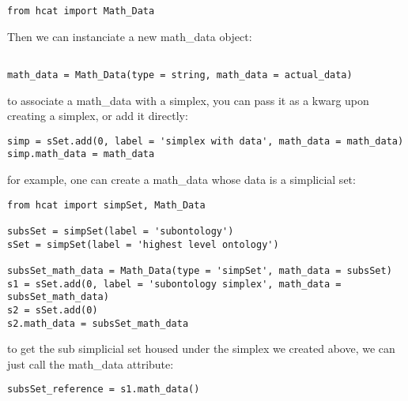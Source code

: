 \documentclass{article}
\begin{document}
\begin{lstlisting}
from hcat import Math_Data

\end{lstlisting}

Then we can instanciate a new math\_data object:
\begin{lstlisting}

math_data = Math_Data(type = string, math_data = actual_data)
\end{lstlisting}


to associate a math\_data with a simplex, you can pass it as a kwarg upon creating a simplex, or add it directly:

\begin{lstlisting}
simp = sSet.add(0, label = 'simplex with data', math_data = math_data)
simp.math_data = math_data
\end{lstlisting}

for example, one can create a math\_data whose data is a simplicial set:\\

\begin{lstlisting}
from hcat import simpSet, Math_Data

subsSet = simpSet(label = 'subontology')
sSet = simpSet(label = 'highest level ontology')

subsSet_math_data = Math_Data(type = 'simpSet', math_data = subsSet)
s1 = sSet.add(0, label = 'subontology simplex', math_data = subsSet_math_data)
s2 = sSet.add(0)
s2.math_data = subsSet_math_data
\end{lstlisting}

to get the sub simplicial set housed under the simplex we created above, we can just call the math\_data attribute:

\begin{lstlisting}
subsSet_reference = s1.math_data()
\end{lstlisting}
\end{document}
